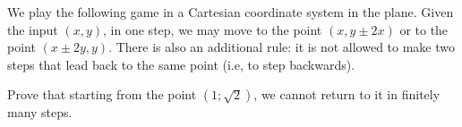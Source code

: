 We play the following game in a Cartesian coordinate system in the plane. Given the input $(x,y)$, in one step, we may move to the point $(x,y\pm 2x)$ or to the point $(x\pm 2y,y)$. There is also an additional rule: it is not allowed to make two steps that lead back to the same point (i.e, to step backwards).

Prove that starting from the point $\left(1;\sqrt 2\right)$, we cannot return to it in finitely many steps.